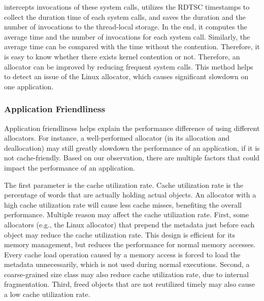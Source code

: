 \MP{} intercepts invocations of these system calls, utilizes the RDTSC timestamps to collect the duration time of each system calls, and saves the duration and the number of invocations to the thread-local storage. In the end, it computes the average time and the number of invocations for each system call. Similarly, the average time can be compared with the time without the contention. Therefore, it is easy to know whether there exists kernel contention or not. Therefore, an allocator can be improved by reducing frequent system calls. This method helps to detect an issue of the Linux allocator, which causes significant slowdown on one application. 

  

\subsubsection{Application Friendliness} 
\label{sec:friendliness}

Application friendliness helps explain the performance difference of using different allocators. For instance, a well-performed allocator (in its allocation and deallocation) may still greatly slowdown the performance of an application, if it is not cache-friendly. Based on our observation, there are multiple factors that could impact the performance of an application.

The first parameter is the cache utilization rate. Cache utilization rate is the percentage of words that are actually holding actual objects. An allocator with a high cache utilization rate will cause less cache misses, benefiting the overall performance. Multiple reason may affect the cache utilization rate. First, some allocators (e.g., the Linux allocator) that  prepend the metadata just before each object may reduce the cache utilization rate. This design is efficient for its memory management, but reduces the performance for normal memory accesses. Every cache load operation caused by a memory access is forced to load the metadata unnecessarily, which is not used during normal executions. 
 Second, a coarse-grained size class may also reduce cache utilization rate, due to internal fragmentation. Third, freed objects that are not reutilized timely may also cause a low cache utilization rate. 

